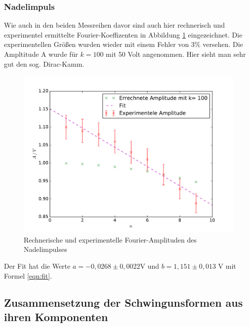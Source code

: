 \subsubsection{Nadelimpuls}
Wie auch in den beiden Messreihen davor sind auch hier rechnerisch und experimentel
ermittelte Fourier-Koeffizenten in Abbildung \ref{fig:np} eingezeichnet. Die experimentellen
Größen wurden wieder mit einem Fehler von 3\% versehen. Die Ampltitude A wurde für $k = 100$
mit 50 Volt angenommen. Hier sieht man sehr gut den sog. Dirac-Kamm.
\begin{figure}
  \centering
  \includegraphics[width= \textwidth]{Plots/Nadelimpulsplot.pdf}
  \caption{Rechnerische und experimentelle Fourier-Amplituden des Nadelimpulses}
  \label{fig:np}
\end{figure}
\FloatBarrier
Der Fit hat die Werte $ a = -0,0268 \pm 0,0022 $V und $ b = 1,151 \pm 0,013$ V mit Formel \eqref{eqn:fit}.

\subsection{Zusammensetzung der Schwingunsformen aus ihren Komponenten}
\label{sec:3.3}
